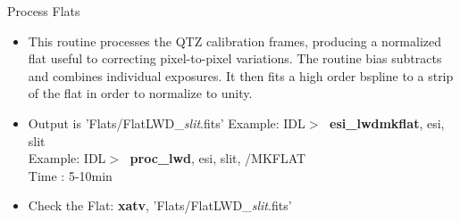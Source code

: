 \documentclass[11pt,letterpaper,dvips]{article}
\begin{document}
\begin{enumerate}
{\Large  \item Process Flats }
  \begin{itemize}
	\item This routine processes the QTZ calibration frames, producing
	a normalized flat useful to correcting pixel-to-pixel variations. 
	The routine bias subtracts and combines individual exposures.
	It then fits a high order bspline to a strip of the flat in order
	to normalize to unity.
	\item Output is 'Flats/FlatLWD\_{\it slit}.fits'
         \quad Example: IDL$> \;$ {\bf esi\_lwdmkflat}, esi, slit \\
         \quad Example: IDL$> \;$ {\bf proc\_lwd}, esi, slit, /MKFLAT \\
         \quad Time   : 5-10min
	\item Check the Flat: {\bf xatv}, 'Flats/FlatLWD\_{\it slit}.fits'
  \end{itemize}
\end{enumerate}
\end{document}
